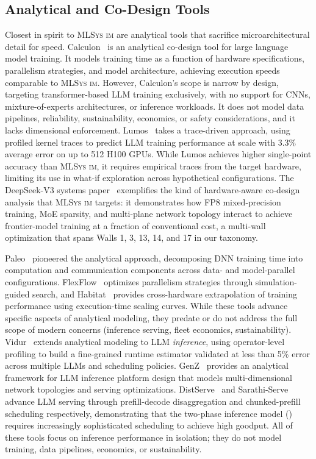 \documentclass[10pt,twocolumn]{article}
\newcommand{\mlsysim}{\mbox{\textsc{MLSys}\,\textperiodcentered\,\textsc{im}}\xspace}
\begin{document}
\subsection{Analytical and Co-Design Tools}

Closest in spirit to \mlsysim are analytical tools that sacrifice microarchitectural detail for speed. Calculon~\citep{isaev2023} is an analytical co-design tool for large language model training. It models training time as a function of hardware specifications, parallelism strategies, and model architecture, achieving execution speeds comparable to \mlsysim. However, Calculon's scope is narrow by design, targeting transformer-based LLM training exclusively, with no support for CNNs, mixture-of-experts architectures, or inference workloads. It does not model data pipelines, reliability, sustainability, economics, or safety considerations, and it lacks dimensional enforcement. Lumos~\citep{liang2025lumos} takes a trace-driven approach, using profiled kernel traces to predict LLM training performance at scale with 3.3\% average error on up to 512 H100 GPUs. While Lumos achieves higher single-point accuracy than \mlsysim, it requires empirical traces from the target hardware, limiting its use in what-if exploration across hypothetical configurations. The DeepSeek-V3 systems paper~\citep{deepseek2025v3} exemplifies the kind of hardware-aware co-design analysis that \mlsysim targets: it demonstrates how FP8 mixed-precision training, MoE sparsity, and multi-plane network topology interact to achieve frontier-model training at a fraction of conventional cost, a multi-wall optimization that spans Walls 1, 3, 13, 14, and 17 in our taxonomy.

Paleo~\citep{qi2017paleo} pioneered the analytical approach, decomposing DNN training time into computation and communication components across data- and model-parallel configurations. FlexFlow~\citep{jia2019flexflow} optimizes parallelism strategies through simulation-guided search, and Habitat~\citep{yu2021habitat} provides cross-hardware extrapolation of training performance using execution-time scaling curves. While these tools advance specific aspects of analytical modeling, they predate or do not address the full scope of modern concerns (inference serving, fleet economics, sustainability). Vidur~\citep{agrawal2024vidur} extends analytical modeling to LLM \emph{inference}, using operator-level profiling to build a fine-grained runtime estimator validated at less than 5\% error across multiple LLMs and scheduling policies. GenZ~\citep{bambhaniya2024genz} provides an analytical framework for LLM inference platform design that models multi-dimensional network topologies and serving optimizations. DistServe~\citep{zhong2024distserve} and Sarathi-Serve~\citep{agrawal2025} advance LLM serving through prefill-decode disaggregation and chunked-prefill scheduling respectively, demonstrating that the two-phase inference model () requires increasingly sophisticated scheduling to achieve high goodput. All of these tools focus on inference performance in isolation; they do not model training, data pipelines, economics, or sustainability.
\end{document}
